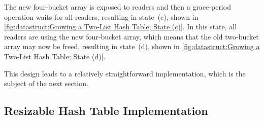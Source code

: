 The new four-bucket array is exposed to readers and then a grace-period
operation waits for all readers, resulting in state~(c), shown in
\cref{fig:datastruct:Growing a Two-List Hash Table; State (c)}.
In this state, all readers are using the new four-bucket array,
which means that the old two-bucket array may now be freed, resulting
in state~(d), shown in
\cref{fig:datastruct:Growing a Two-List Hash Table; State (d)}.

This design leads to a relatively straightforward implementation,
which is the subject of the next section.

\subsection{Resizable Hash Table Implementation}
\label{sec:datastruct:Resizable Hash Table Implementation}

